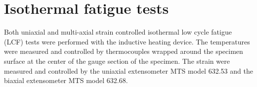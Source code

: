 %
%
%

\section{Isothermal fatigue tests}
\noindent Both uniaxial and multi-axial strain controlled isothermal low cycle fatigue (LCF) tests were performed with the inductive heating device.
The temperatures were measured and controlled by thermocouples wrapped around the specimen surface at the center of the gauge section of the specimen.
The strain were measured and controlled by the uniaxial extensometer MTS model 632.53 and the biaxial extensometer MTS model 632.68.

